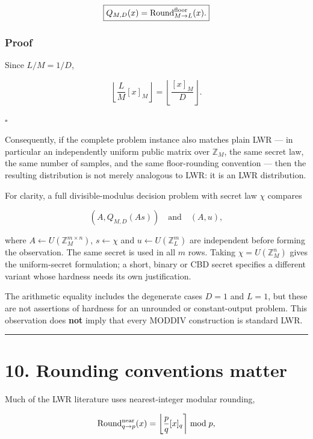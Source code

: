 \documentclass[11pt,a4paper]{article}
\begin{document}
\[
\boxed{
Q_{M,D}(x)
=
\operatorname{Round}^{\rm floor}_{M\to L}(x).
}
\]

\subsubsection{Proof}\label{proof-9}

Since \(L/M=1/D\),

\[
\left\lfloor
\frac{L}{M}[x]_M
\right\rfloor
=
\left\lfloor
\frac{[x]_M}{D}
\right\rfloor.
\]

\(\square\)

Consequently, if the complete problem instance also matches plain LWR --- in particular an independently uniform public matrix over \(\mathbb Z_M\), the same secret law, the same number of samples, and the same floor-rounding convention --- then the resulting distribution is not merely analogous to LWR: it is an LWR distribution.

For clarity, a full divisible-modulus decision problem with secret law \(\chi\) compares

\[
(A,Q_{M,D}(As))\quad\text{and}\quad(A,u),
\]

where \(A\leftarrow U(\mathbb Z_M^{m\times n})\), \(s\leftarrow\chi\) and \(u\leftarrow U(\mathbb Z_L^m)\) are independent before forming the observation. The same secret is used in all \(m\) rows. Taking \(\chi=U(\mathbb Z_M^n)\) gives the uniform-secret formulation; a short, binary or CBD secret specifies a different variant whose hardness needs its own justification.

The arithmetic equality includes the degenerate cases \(D=1\) and \(L=1\), but these are not assertions of hardness for an unrounded or constant-output problem. This observation does \textbf{not} imply that every MODDIV construction is standard LWR.

\begin{center}\rule{0.5\linewidth}{0.5pt}\end{center}

\section{10. Rounding conventions matter}\label{rounding-conventions-matter}

Much of the LWR literature uses nearest-integer modular rounding,

\[
\operatorname{Round}^{\rm near}_{q\to p}(x)
=
\left\lfloor
\frac pq[x]_q
\right\rceil
\bmod p,
\]
\end{document}
